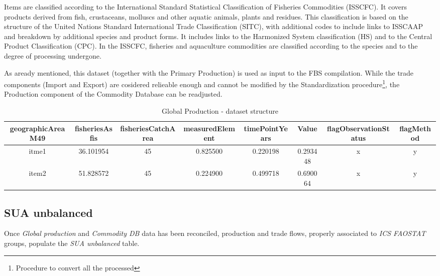 \documentclass[nojss]{jss}
\begin{document}
Items are classified according to the International Standard Statistical Classification of Fisheries Commodities (ISSCFC). It covers products derived from fish, crustaceans, molluscs and other aquatic animals, plants and residues. This classification is based on the structure of the United Nations Standard International Trade Classification (SITC), with additional codes to include links to ISSCAAP and breakdown by additional species and product forms. It includes links to the Harmonized System classification (HS) and to the Central Product Classification (CPC). In the ISSCFC, fisheries and aquaculture commodities are classified according to the species and to the degree of processing undergone.

As aready mentioned, this dataset (together with the Primary Production) is used as input to the FBS compilation. While the trade components (Import and Export) are cosidered relieable enough and cannot be modified by the Standardization procedure\footnote{Procedure to convert all the processed }, the Production component of the Commodity Database can be readjusted.

\begin{landscape}
\begin{table}[t]
\caption{Global Production - dataset structure}
\centering
\begin{tabular}{c|c|c|c|c|c|c|c}
\toprule
geographicAreaM49 & fisheriesAsfis & fisheriesCatchArea & measuredElement & timePointYears & Value & flagObservationStatus & flagMethod\\
\midrule

itme1 & 36.101954 & 45 & 0.825500 & 0.220198 & 0.293448 & x & y \\
item2 & 51.828572 & 45 & 0.224900 & 0.499718 & 0.690064& x & y \\

\bottomrule
\end{tabular}
\label{tab:xxx}
\end{table}


\end{landscape}



\subsection{SUA unbalanced}
Once \textit{Global production} and \textit{Commodity DB} data has been reconciled, production and trade flows, properly associated to \textit{ICS FAOSTAT} groups, populate the \textit{SUA unbalanced} table.
\end{document}
